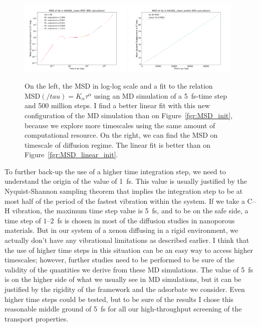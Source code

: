 \documentclass[main]{subfiles}
\begin{document}
\begin{figure}[ht]
  \centering
  \includegraphics[width=0.48\textwidth]{figures/5-diffusion/MSD_Xe_KAXQIL_clean_5fs.pdf}
  \includegraphics[width=0.48\textwidth]{figures/5-diffusion/MSD_Xe_coeff_KAXQIL_clean_5fs.pdf}
\caption{ On the left, the MSD in log-log scale and a fit to the relation $\text{MSD}(/tau) = K_\alpha\tau^\alpha$ using an MD simulation of a \SI{5}{\fs}-time step and 500 million steps. I find a better linear fit with this new configuration of the MD simulation than on Figure~\ref{fgr:MSD_init}, because we explore more timescales using the same amount of computational resource. On the right, we can find the MSD on timescale of diffusion regime. The linear fit is better than on Figure~\ref{fgr:MSD_linear_init}.}\label{fgr:MSD_5fs}
\end{figure}

To further back-up the use of a higher time integration step, we need to understand the origin of the value of \SI{1}{\fs}. This value is usually justified by the Nyquist-Shannon sampling theorem that implies the integration step to be at most half of the period of the fastest vibration within the system. If we take a C--H vibration, the maximum time step value is \SI{5}{\fs}, and to be on the safe side, a time step of $1$--$2$~\si{\fs} is chosen in most of the diffusion studies in nanoporous materials.\autocite{Bukowski_2021} But in our system of a xenon diffusing in a rigid environment, we actually don't have any vibrational limitations as described earlier. I think that the use of higher time steps in this situation can be an easy way to access higher timescales; however, further studies need to be performed to be sure of the validity of the quantities we derive from these MD simulations. The value of \SI{5}{\fs} is on the higher side of what we usually see in MD simulations, but it can be justified by the rigidity of the framework and the adsorbate we consider. Even higher time steps could be tested, but to be sure of the results I chose this reasonable middle ground of \SI{5}{\fs} for all our high-throughput screening of the transport properties.
\end{document}
